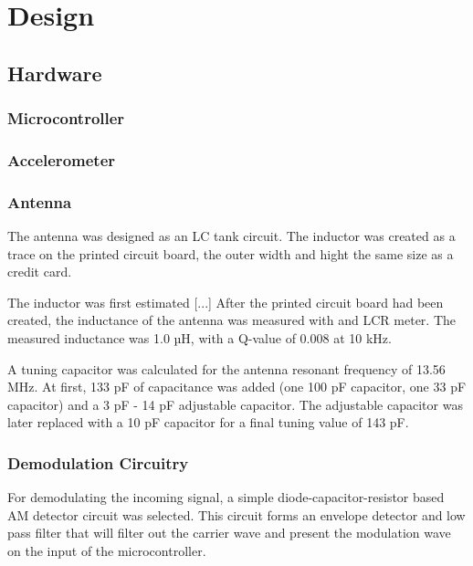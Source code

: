 \section{Design}

\subsection{Hardware}

\subsubsection{Microcontroller}
\subsubsection{Accelerometer}

\subsubsection{Antenna}
The antenna was designed as an LC tank circuit.
The inductor was created as a trace on the printed circuit board, the outer width and hight the same size as a credit card.


The inductor was first estimated [...]
After the printed circuit board had been created, the inductance of the antenna was measured with and LCR meter.
The measured inductance was 1.0 µH, with a Q-value of 0.008 at 10 kHz.

A tuning capacitor was calculated for the antenna resonant frequency of 13.56 MHz.
At first, 133 pF of capacitance was added (one 100 pF capacitor, one 33 pF capacitor) and a 3 pF - 14 pF adjustable capacitor. The
adjustable capacitor was later replaced with a 10 pF capacitor for a final tuning value of 143 pF.

\subsubsection{Demodulation Circuitry}
For demodulating the incoming signal, a simple diode-capacitor-resistor based AM detector circuit was selected.
This circuit forms an envelope detector and low pass filter that will filter out the carrier wave and present the modulation wave on the input of the microcontroller.

